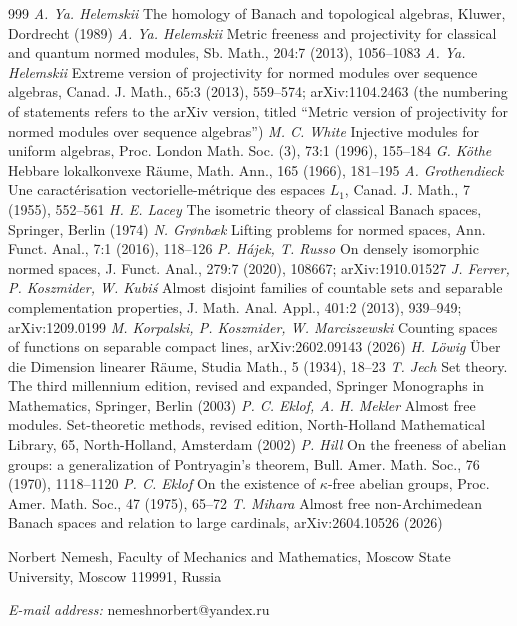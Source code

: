 \documentclass[12pt]{article}
\begin{document}
\begin{thebibliography}{999}
    \textit{A. Ya. Helemskii} The homology of Banach and topological algebras,
    Kluwer, Dordrecht (1989)
    \textit{A. Ya. Helemskii} Metric freeness and projectivity for classical
    and quantum normed modules, Sb. Math., 204:7 (2013), 1056--1083
    \textit{A. Ya. Helemskii} Extreme version of projectivity for normed
    modules over sequence algebras, Canad. J. Math., 65:3 (2013), 559--574;
    arXiv:1104.2463 (the numbering of statements refers to the arXiv
    version, titled ``Metric version of projectivity for normed modules over
    sequence algebras'')
    \textit{M. C. White} Injective modules for uniform algebras, Proc. London
    Math. Soc. (3), 73:1 (1996), 155--184
    \textit{G. K\"othe} Hebbare lokalkonvexe R\"aume, Math. Ann., 165 (1966),
    181--195
    \textit{A. Grothendieck} Une caract\'erisation vectorielle-m\'etrique des
    espaces $L_1$, Canad. J. Math., 7 (1955), 552--561
    \textit{H. E. Lacey} The isometric theory of classical Banach spaces,
    Springer, Berlin (1974)
    \textit{N. Gr{\o}nb{\ae}k} Lifting problems for normed spaces, Ann. Funct.
    Anal., 7:1 (2016), 118--126
    \textit{P. H\'ajek, T. Russo} On densely isomorphic normed spaces,
    J. Funct. Anal., 279:7 (2020), 108667; arXiv:1910.01527
    \textit{J. Ferrer, P. Koszmider, W. Kubi\'s} Almost disjoint families of
    countable sets and separable complementation properties, J. Math. Anal.
    Appl., 401:2 (2013), 939--949; arXiv:1209.0199
    \textit{M. Korpalski, P. Koszmider, W. Marciszewski} Counting spaces of
    functions on separable compact lines, arXiv:2602.09143 (2026)
    \textit{H. L\"owig} \"Uber die Dimension linearer R\"aume, Studia Math.,
    5 (1934), 18--23
    \textit{T. Jech} Set theory. The third millennium edition, revised and
    expanded, Springer Monographs in Mathematics, Springer, Berlin (2003)
    \textit{P. C. Eklof, A. H. Mekler} Almost free modules. Set-theoretic
    methods, revised edition, North-Holland Mathematical Library, 65,
    North-Holland, Amsterdam (2002)
    \textit{P. Hill} On the freeness of abelian groups: a generalization of
    Pontryagin's theorem, Bull. Amer. Math. Soc., 76 (1970), 1118--1120
    \textit{P. C. Eklof} On the existence of $\kappa$-free abelian groups,
    Proc. Amer. Math. Soc., 47 (1975), 65--72
    \textit{T. Mihara} Almost free non-Archimedean Banach spaces and relation
    to large cardinals, arXiv:2604.10526 (2026)
\end{thebibliography}

Norbert Nemesh, Faculty of Mechanics and Mathematics, Moscow State University,
Moscow 119991, Russia

\textit{E-mail address:} nemeshnorbert@yandex.ru
\end{document}
